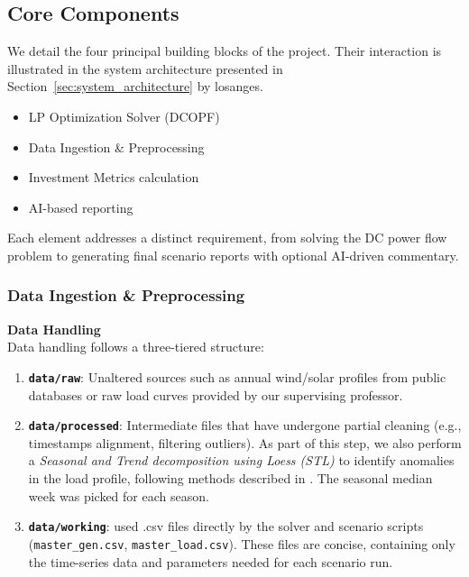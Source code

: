 \subsection{Core Components}
We detail the four principal building blocks of the project. Their interaction is illustrated in the system 
architecture presented in Section~\ref{sec:system_architecture} by losanges.

\begin{multicols}{2}
\begin{itemize}
  \item LP Optimization Solver (DCOPF)
  \item Data Ingestion \& Preprocessing
\end{itemize}
\columnbreak
\begin{itemize}
  \item Investment Metrics calculation
  \item AI-based reporting
\end{itemize}
\end{multicols}
Each element addresses a distinct requirement, from solving the DC power flow problem to 
generating final scenario reports with optional AI-driven commentary.


\subsubsection{Data Ingestion \& Preprocessing}
\label{sec:data_preprocessing}

\textbf{Data Handling} \\
Data handling follows a three-tiered structure:

\begin{enumerate}
  \item \textbf{\texttt{data/raw}}: Unaltered sources such as annual wind/solar profiles from public 
  databases or raw load curves provided by our supervising professor.

  \item \textbf{\texttt{data/processed}}: Intermediate files that have undergone partial cleaning 
  (e.g., timestamps alignment, filtering outliers). As part of this step, we also perform a 
  \emph{Seasonal and Trend decomposition using Loess (STL)} to identify anomalies in the load profile, following 
  methods described in \cite{predictive_modeling_notes}. The seasonal median week was picked for each season.

  \item \textbf{\texttt{data/working}}: used .csv files directly by the solver and scenario 
  scripts (\texttt{master\_gen.csv}, \texttt{master\_load.csv}). These files are concise, 
  containing only the time-series data and parameters needed for each scenario run.

\end{enumerate}

